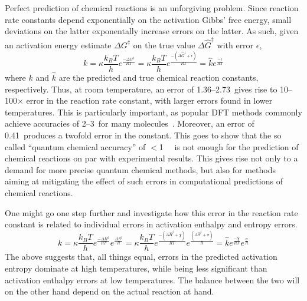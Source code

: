 Perfect prediction of chemical reactions is an unforgiving problem.
Since reaction rate constants depend exponentially on the activation Gibbs' free energy,
small deviations on the latter exponentally increase errors on the latter.
As such,
given an activation energy estimate $\Delta G^\ddagger$
on the true value $\Delta \widehat{G}^\ddagger$
with error $\epsilon$,
%
\begin{equation}
	k = \kappa \frac{k_B T}{h} e^\frac{- \Delta G^\ddagger}{R T}
	= \kappa \frac{k_B T}{h} e^\frac{- \left(\Delta \widehat{G}^\ddagger + \epsilon\right)}{R T}
	= \widehat{k} e^\frac{- \epsilon}{R T}
\end{equation}
%
where $k$ and $\widehat{k}$ are the predicted and true chemical reaction constants,
respectively.
Thus,
at room temperature,
an error of 1.36--2.73~\kcalmol gives rise to 10--100$\times$ error
in the reaction rate constant,
with larger errors found in lower temperatures.
This is particularly important,
as popular DFT methods commonly achieve accuracies of
2--3~\kcalmol for many molecules~\cite{Becke_2014,Bogojeski_2020}.
Moreover,
an error of 0.41~\kcalmol produces a twofold error in the constant.
This goes to show that the so called ``quantum chemical accuracy'' of
$<$1~\kcalmol~\cite{Bogojeski_2020}
is not enough for the prediction of chemical reactions on par with experimental results.
This gives rise not only to a demand
for more precise quantum chemical methods,
but also for methods aiming at mitigating the effect of such errors
in computational predictions of chemical reactions.

One might go one step further and investigate how this error in the reaction rate constant
is related to individual errors in activation enthalpy and entropy errors.
%
\begin{equation}
	k = \kappa \frac{k_B T}{h} e^\frac{- \Delta H^\ddagger}{R T}
	e^\frac{  \Delta S^\ddagger}{R}
	= \kappa \frac{k_B T}{h} e^\frac{- \left(\Delta \widehat{H}^\ddagger + \chi\right)}{R T}
	e^\frac{        \left(\Delta \widehat{S}^\ddagger + \sigma\right)}{R}
	= \widehat{k}
	e^\frac{- \chi}{R T}
	e^\frac{  \sigma}{R}
\end{equation}
%
The above suggests that,
all things equal,
errors in the predicted activation entropy dominate at high temperatures,
while being less significant
than activation enthalpy errors at low temperatures.
The balance between the two will on the other hand depend on the actual reaction at hand.

